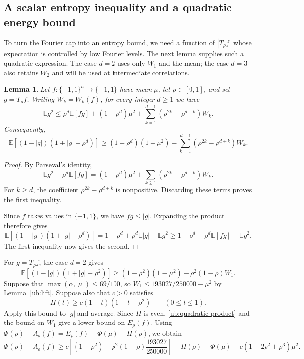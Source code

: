 \documentclass[11pt,letterpaper]{amsart}
\newcommand{\E}{\mathbb E}
\newcommand{\1}{\mathbf 1}
\newtheorem{lemma}[theorem]{Lemma}
\numberwithin{equation}{section}
\begin{document}
\subsection{A scalar entropy inequality and a quadratic energy bound}

To turn the Fourier cap into an entropy bound, we need a function of
$|T_\rho f|$ whose expectation is controlled by low Fourier levels.
The next lemma supplies such a quadratic expression. The case $d=2$
uses only $W_1$ and the mean; the case $d=3$ also retains $W_2$ and
will be used at intermediate correlations.

\begin{lemma}\label{ub:degree-energy}
Let $f:\{-1,1\}^n\to\{-1,1\}$ have mean $\mu$,
let $\rho\in[0,1]$, and set $g=T_\rho f$.
Writing $W_k=W_k(f)$, for every integer $d\ge1$ we have
\[
 \E g^2\le \rho^d\E[fg]+(1-\rho^d)\mu^2
   +\sum_{k=1}^{d-1}(\rho^{2k}-\rho^{d+k})W_k.
\]
Consequently,
\[
 \E[(1-|g|)(1+|g|-\rho^d)]
 \ge (1-\rho^d)(1-\mu^2)
   -\sum_{k=1}^{d-1}(\rho^{2k}-\rho^{d+k})W_k.
\]
\end{lemma}
\begin{proof}
By Parseval's identity,
\[
 \E g^2-\rho^d\E[fg]
 =(1-\rho^d)\mu^2
   +\sum_{k\ge1}(\rho^{2k}-\rho^{d+k})W_k.
\]
For $k\ge d$, the coefficient
$\rho^{2k}-\rho^{d+k}$ is nonpositive.
Discarding these terms proves the first inequality.

Since $f$ takes values in $\{-1,1\}$, we have $fg\le|g|$.
Expanding the product therefore gives
\[
\E[(1-|g|)(1+|g|-\rho^d)]=1-\rho^d+\rho^d\E|g|-\E g^2\ge1-\rho^d+\rho^d\E[fg]-\E g^2.
\]
The first inequality now gives the second.
\end{proof}

For $g=T_\rho f$, the case $d=2$ gives
\begin{equation}\label{ub:quadratic-product}
 \E[(1-|g|)(1+|g|-\rho^2)]
 \ge(1-\rho^2)(1-\mu^2)-\rho^2(1-\rho)W_1.
\end{equation}
Suppose that $\max(\alpha,|\mu|)\le69/100$, so
$W_1\le193027/250000-\mu^2$ by Lemma~\ref{ub:lift}.
Suppose also that $c>0$ satisfies
\begin{equation}\label{ub:quadratic-gate}
 H(t)\ge c(1-t)(1+t-\rho^2)
 \qquad(0\le t\le1).
\end{equation}
Apply this bound to $|g|$ and average.
Since $H$ is even, \eqref{ub:quadratic-product} and the
bound on $W_1$ give a lower bound on $E_\rho(f)$.
Using $\Phi(\rho)-A_\rho(f)=E_\rho(f)+\Phi(\mu)-H(\rho)$,
we obtain
\begin{equation}\label{ub:quadratic-budget}
\Phi(\rho)-A_\rho(f)\ge c\left[(1-\rho^2)
       -\rho^2(1-\rho)\frac{193027}{250000}\right]-H(\rho)+\Phi(\mu)-c(1-2\rho^2+\rho^3)\mu^2.
\end{equation}
\end{document}
